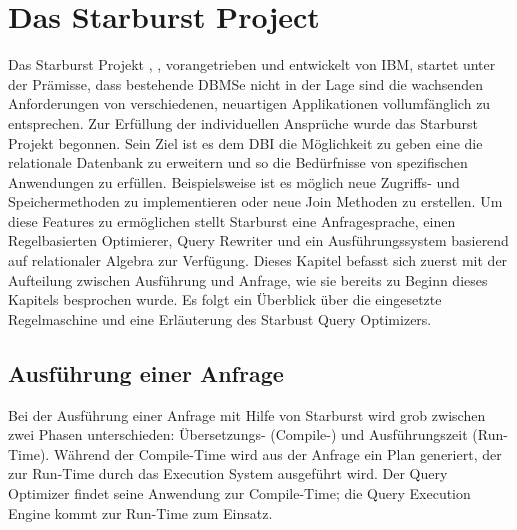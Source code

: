 \section{Das Starburst Project}

Das Starburst Projekt \cite{lohman1988Starbust}, \cite{haas1989extensible}, vorangetrieben und entwickelt von IBM,  startet unter der Prämisse, dass bestehende DBMSe nicht in der Lage sind die wachsenden Anforderungen von verschiedenen, neuartigen Applikationen vollumfänglich zu entsprechen. Zur Erfüllung der individuellen Ansprüche wurde das Starburst Projekt begonnen. Sein Ziel ist es dem \ac{DBI} die Möglichkeit zu geben eine die relationale Datenbank zu erweitern und so die Bedürfnisse von spezifischen Anwendungen zu erfüllen. Beispielsweise ist es möglich neue Zugriffs- und Speichermethoden zu implementieren oder neue Join Methoden zu erstellen. Um diese Features zu ermöglichen stellt Starburst eine Anfragesprache, einen Regelbasierten Optimierer, Query Rewriter und ein Ausführungssystem basierend auf relationaler Algebra zur Verfügung. Dieses Kapitel befasst sich zuerst mit der Aufteilung zwischen Ausführung und Anfrage, wie sie bereits zu Beginn dieses Kapitels besprochen wurde. Es folgt ein Überblick über die eingesetzte Regelmaschine und eine Erläuterung des Starbust Query Optimizers.

\subsection{Ausführung einer Anfrage}

Bei der Ausführung einer Anfrage mit Hilfe von Starburst wird grob zwischen zwei Phasen unterschieden: Übersetzungs- (Compile-) und Ausführungszeit (Run-Time). Während der Compile-Time wird aus der Anfrage ein Plan generiert, der zur Run-Time durch das Execution System ausgeführt wird. Der Query Optimizer findet seine Anwendung zur Compile-Time; die Query Execution Engine kommt zur Run-Time zum Einsatz.

